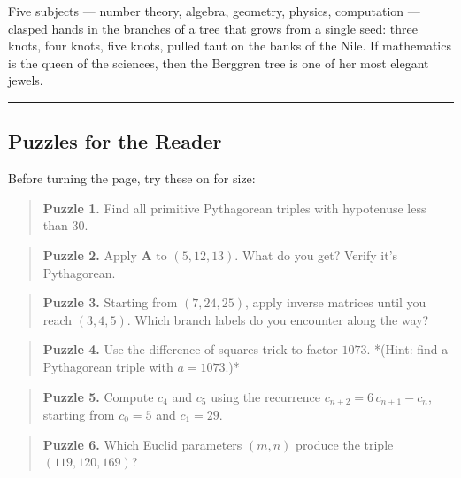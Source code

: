 \documentclass[12pt, letterpaper, openany]{book}
\theoremstyle{definition}
\theoremstyle{remark}
\begin{document}
Five subjects --- number theory, algebra, geometry, physics, computation --- clasped hands in the branches of a tree that grows from a single seed: three knots, four knots, five knots, pulled taut on the banks of the Nile. If mathematics is the queen of the sciences, then the Berggren tree is one of her most elegant jewels.


\bigskip\noindent\rule{\textwidth}{0.4pt}\bigskip



\subsection*{Puzzles for the Reader}


Before turning the page, try these on for size:


\begin{quote}
\textbf{Puzzle 1.} Find all primitive Pythagorean triples with hypotenuse less than $30$.
\end{quote}



\begin{quote}
\textbf{Puzzle 2.} Apply $\mathbf{A}$ to $(5, 12, 13)$. What do you get? Verify it's Pythagorean.
\end{quote}



\begin{quote}
\textbf{Puzzle 3.} Starting from $(7, 24, 25)$, apply inverse matrices until you reach $(3, 4, 5)$. Which branch labels do you encounter along the way?
\end{quote}



\begin{quote}
\textbf{Puzzle 4.} Use the difference-of-squares trick to factor $1073$. *(Hint: find a Pythagorean triple with $a = 1073$.)*
\end{quote}



\begin{quote}
\textbf{Puzzle 5.} Compute $c_4$ and $c_5$ using the recurrence $c_{n+2} = 6\,c_{n+1} - c_n$, starting from $c_0 = 5$ and $c_1 = 29$.
\end{quote}



\begin{quote}
\textbf{Puzzle 6.} Which Euclid parameters $(m, n)$ produce the triple $(119, 120, 169)$?
\end{quote}
\end{document}
